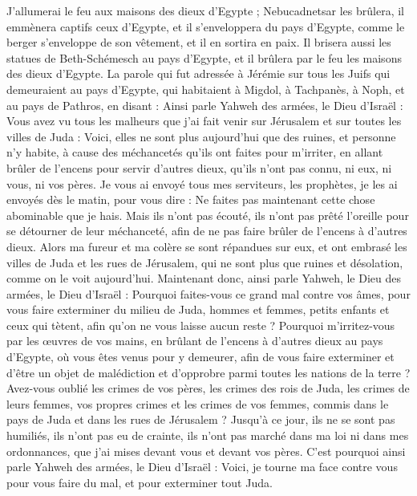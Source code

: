 \begin{multicols}{2}
J'allumerai le feu aux maisons des dieux d'Egypte ; Nebucadnetsar les brûlera, il emmènera captifs ceux d'Egypte, et il s’enveloppera du pays d'Egypte, comme le berger s'enveloppe de son vêtement, et il en sortira en paix.
Il brisera aussi les statues de Beth-Schémesch au pays d'Egypte, et il brûlera par le feu les maisons des dieux d'Egypte.
\VerseOne{}La parole qui fut adressée à Jérémie sur tous les Juifs qui demeuraient au pays d'Egypte, qui habitaient à Migdol, à Tachpanès, à Noph, et au pays de Pathros, en disant :
Ainsi parle Yahweh des armées, le Dieu d'Israël : Vous avez vu tous les malheurs que j'ai fait venir sur Jérusalem et sur toutes les villes de Juda : Voici, elles ne sont plus aujourd'hui que des ruines, et personne n'y habite,
à cause des méchancetés qu'ils ont faites pour m'irriter, en allant brûler de l’encens pour servir d'autres dieux, qu’ils n'ont pas connu, ni eux, ni vous, ni vos pères.
Je vous ai envoyé tous mes serviteurs, les prophètes, je les ai envoyés dès le matin, pour vous dire : Ne faites pas maintenant cette chose abominable que je hais.
Mais ils n'ont pas écouté, ils n'ont pas prêté l’oreille pour se détourner de leur méchanceté, afin de ne pas faire brûler de l’encens à d'autres dieux.
Alors ma fureur et ma colère se sont répandues sur eux, et ont embrasé les villes de Juda et les rues de Jérusalem, qui ne sont plus que ruines et désolation, comme on le voit aujourd'hui.
Maintenant donc, ainsi parle Yahweh, le Dieu des armées, le Dieu d'Israël : Pourquoi faites-vous ce grand mal contre vos âmes, pour vous faire exterminer du milieu de Juda, hommes et femmes, petits enfants et ceux qui tètent, afin qu'on ne vous laisse aucun reste ?
Pourquoi m'irritez-vous par les œuvres de vos mains, en brûlant de l’encens à d'autres dieux au pays d'Egypte, où vous êtes venus pour y demeurer, afin de vous faire exterminer et d’être un objet de malédiction et d’opprobre parmi toutes les nations de la terre ?
Avez-vous oublié les crimes de vos pères, les crimes des rois de Juda, les crimes de leurs femmes, vos propres crimes et les crimes de vos femmes, commis dans le pays de Juda et dans les rues de Jérusalem ?
Jusqu’à ce jour, ils ne se sont pas humiliés, ils n'ont pas eu de crainte, ils n'ont pas marché dans ma loi ni dans mes ordonnances, que j’ai mises devant vous et devant vos pères.
C'est pourquoi ainsi parle Yahweh des armées, le Dieu d'Israël : Voici, je tourne ma face contre vous pour vous faire du mal, et pour exterminer tout Juda.

\end{multicols}
